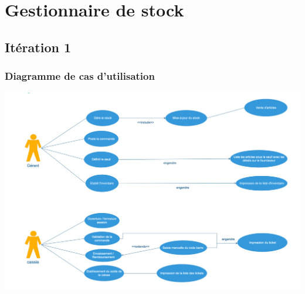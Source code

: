 \documentclass[french,10pt,a4paper]{report}
\begin{document}
\chapter{Gestionnaire de stock}
\section{\textcolor{rr}{Itération 1}}
\subsection{\textcolor{bb}{Diagramme de cas d’utilisation }}
\begin{flushright}
 \includegraphics[scale=0.25]{captures/g_it1_1.png}
\end{flushright}
\end{document}
